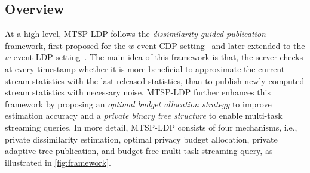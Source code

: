 
\subsection{Overview}

At a high level, MTSP-LDP follows the \emph{dissimilarity guided publication}
framework, first proposed for the $w$-event CDP setting~\cite{Kellaris2014} and
later extended to the $w$-event LDP setting~\cite{Ren2022}.
The main idea of this framework is that, the server checks at every timestamp
whether it is more beneficial to approximate the current stream statistics with
the last released statistics, than to publish newly computed stream statistics
with necessary noise.
MTSP-LDP further enhances this framework by proposing an \emph{optimal budget
  allocation strategy} to improve estimation accuracy and a \emph{private binary
  tree structure} to enable multi-task streaming queries.
In more detail, MTSP-LDP consists of four mechanisms, i.e., private
dissimilarity estimation, optimal privacy budget allocation, private adaptive
tree publication, and budget-free multi-task streaming query, as illustrated in
\cref{fig:framework}.

